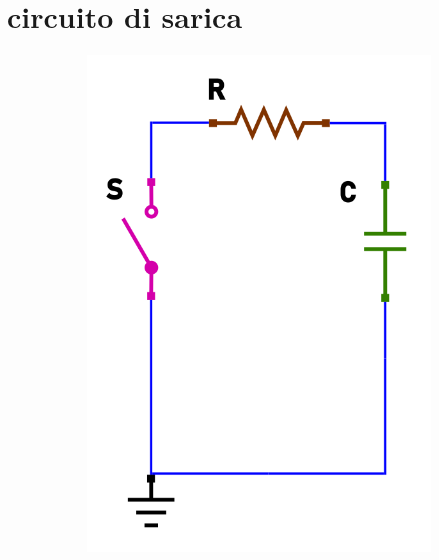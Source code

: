 \documentclass{article}
\begin{document}
\newpage
\section*{circuito di sarica}

\begin{figure}[h!]
  \centering
  \begin{subfigure}[b]{0.3\linewidth}
    \includegraphics[width=\linewidth]{data/scarica-open.png}
  \end{subfigure}
  \begin{subfigure}[b]{0.3\linewidth}

\end{subfigure}
\end{figure}
\end{document}

